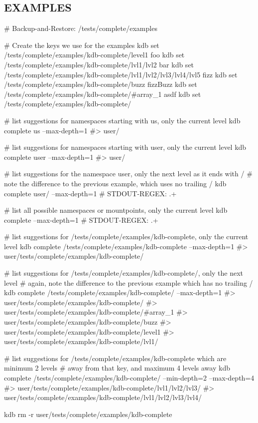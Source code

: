 \subsection*{E\+X\+A\+M\+P\+L\+ES}


\begin{DoxyCode}
# Backup-and-Restore: /tests/complete/examples

# Create the keys we use for the examples
kdb set /tests/complete/examples/kdb-complete/level1 foo
kdb set /tests/complete/examples/kdb-complete/lvl1/lvl2 bar
kdb set /tests/complete/examples/kdb-complete/lvl1/lvl2/lvl3/lvl4/lvl5 fizz
kdb set /tests/complete/examples/kdb-complete/buzz fizzBuzz
kdb set /tests/complete/examples/kdb-complete/#array\_1 asdf
kdb set /tests/complete/examples/kdb-complete/%

# list suggestions for namespaces starting with us, only the current level
kdb complete us --max-depth=1
#> user/

# list suggestions for namespaces starting with user, only the current level
kdb complete user --max-depth=1
#> user/

# list suggestions for the namespace user, only the next level as it ends with /
# note the difference to the previous example, which uses no trailing /
kdb complete user/ --max-depth=1
# STDOUT-REGEX: .+

# list all possible namespaces or mountpoints, only the current level
kdb complete --max-depth=1
# STDOUT-REGEX: .+

# list suggestions for /tests/complete/examples/kdb-complete, only the current level
kdb complete /tests/complete/examples/kdb-complete --max-depth=1
#> user/tests/complete/examples/kdb-complete/

# list suggestions for /tests/complete/examples/kdb-complete/, only the next level
# again, note the difference to the previous example which has no trailing /
kdb complete /tests/complete/examples/kdb-complete/ --max-depth=1
#> user/tests/complete/examples/kdb-complete/%
#> user/tests/complete/examples/kdb-complete/#array\_1
#> user/tests/complete/examples/kdb-complete/buzz
#> user/tests/complete/examples/kdb-complete/level1
#> user/tests/complete/examples/kdb-complete/lvl1/

# list suggestions for /tests/complete/examples/kdb-complete which are minimum 2 levels
# away from that key, and maximum 4 levels away
kdb complete /tests/complete/examples/kdb-complete/ --min-depth=2 --max-depth=4
#> user/tests/complete/examples/kdb-complete/lvl1/lvl2/lvl3/
#> user/tests/complete/examples/kdb-complete/lvl1/lvl2/lvl3/lvl4/

kdb rm -r user/tests/complete/examples/kdb-complete
\end{DoxyCode}


